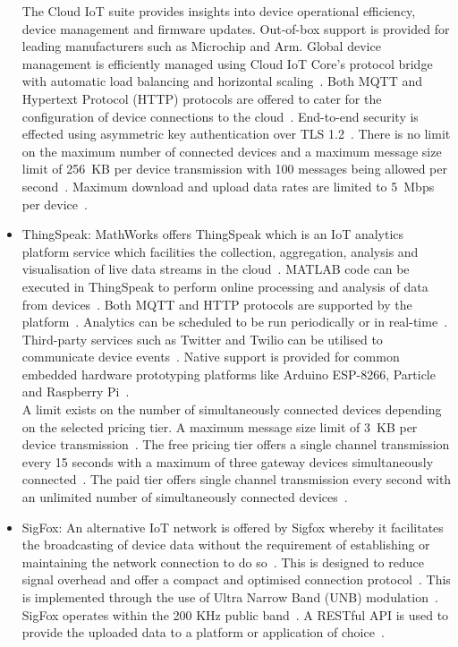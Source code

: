\documentclass[10pt,twocolumn]{witseiepaper}
\begin{document}
\begin{itemize}
				The Cloud IoT suite provides insights into device operational efficiency, device management and firmware updates. Out-of-box support is provided for leading manufacturers such as Microchip and Arm. Global device management is efficiently managed using Cloud IoT Core's protocol bridge with automatic load balancing and horizontal scaling~\cite{cloud-iot}. Both MQTT and Hypertext Protocol (HTTP) protocols are offered to cater for the configuration of device connections to the cloud~\cite{gcp-security}. End-to-end security is effected using asymmetric key authentication over TLS 1.2~\cite{gcp-security}. There is no limit on the maximum number of connected devices and a maximum message size limit of 256~KB per device transmission with 100 messages being allowed per second~\cite{gcp-quota}. Maximum download and upload data rates are limited to 5~Mbps per device~\cite{gcp-quota}.\\
			
				\item ThingSpeak:
				MathWorks offers ThingSpeak which is an IoT analytics platform service which facilities the collection, aggregation, analysis and visualisation of live data streams in the cloud~\cite{thingspeak}. MATLAB code can be executed in ThingSpeak to perform online processing and analysis of data from devices~\cite{thingspeak}. Both MQTT and HTTP protocols are supported by the platform~\cite{thingspeak}. Analytics can be scheduled to be run periodically or in real-time~\cite{thingspeak}. Third-party services such as Twitter and Twilio can be utilised to communicate device events~\cite{thingspeak}. Native support is provided for common embedded hardware prototyping platforms like Arduino ESP-8266, Particle and Raspberry Pi~\cite{thingspeak}.\\
				
				A limit exists on the number of simultaneously connected devices depending on the selected pricing tier. A maximum message size limit of 3~KB per device transmission~\cite{thing-quota}. The free pricing tier offers a single channel transmission every 15 seconds with a maximum of three gateway devices simultaneously connected~\cite{thing-quota}. The paid tier offers single channel transmission every second with an unlimited number of simultaneously connected devices~\cite{thing-quota}.\\
				
				\item SigFox:
				An alternative IoT network is offered by Sigfox whereby it facilitates the broadcasting of device data without the requirement of establishing or maintaining the network connection to do so~\cite{sigfox-tech}. This is designed to reduce signal overhead and offer a compact and optimised connection protocol~\cite{sigfox-security}. This is implemented through the use of Ultra Narrow Band (UNB) modulation~\cite{sigfox-tech}. SigFox operates within the 200 KHz public band~\cite{sigfox-tech}. A RESTful API is used to provide the uploaded data to a platform or application of choice~\cite{sigfox-security}.\\
				

\end{itemize}
\end{document}

